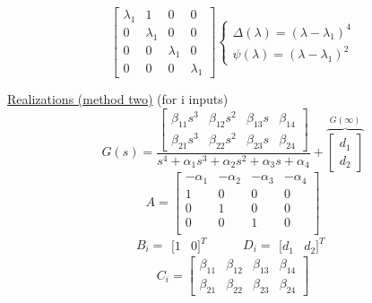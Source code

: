 \documentclass[twocolumn]{article}    %
\begin{document}
\begin{equation*}
    \begin{bmatrix}
        \lambda_1 & 1 & 0 &0\\
        0 &  \lambda_1 & 0 & 0\\
        0 & 0 & \lambda_1 & 0\\
        0 & 0 & 0 & \lambda_1
    \end{bmatrix} 
    \begin{cases}
        \Delta (\lambda) = (\lambda-\lambda_1)^4\\
        \psi (\lambda) = (\lambda-\lambda_1)^2
    \end{cases}
\end{equation*}

\noindent
\underline{Realizations (method two)} \hspace{15pt} (for i inputs)\\
\begin{equation*}
    G(s) = \frac{\begin{bmatrix}
        \beta_{11}s^3 & \beta_{12}s^2 & \beta_{13}s & \beta_{14}\\
        \beta_{21}s^3 & \beta_{22}s^2 & \beta_{23}s & \beta_{24}
    \end{bmatrix}} {s^4 + \alpha_1s^3 + \alpha_2s^2 + \alpha_3 s +\alpha_4} + \overbrace{\begin{bmatrix}
        d_1\\ d_2
    \end{bmatrix}}^{G(\infty)}
\end{equation*}
\begin{equation*}
    A = \begin{bmatrix}
        -\alpha_1 & -\alpha_2 & -\alpha_3 & -\alpha_4 \\
        1 & 0  & 0 & 0 \\
        0 & 1 & 0 & 0 \\
        0 & 0 & 1 & 0\\
    \end{bmatrix}
\end{equation*}
\begin{equation*}
    B_i = \begin{matrix}
        [1 & 0]^T 
    \end{matrix} \hspace{30pt} D_i = \begin{matrix}
        [d_1 & d_2]^T
    \end{matrix}
\end{equation*}
\begin{equation*}
    C_i = \begin{bmatrix}
        \beta_{11} & \beta_{12} & \beta_{13} & \beta_{14}\\
        \beta_{21} & \beta_{22} & \beta_{23} & \beta_{24}
    \end{bmatrix}
\end{equation*}
\end{document}
